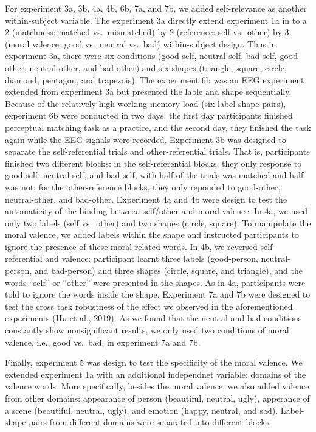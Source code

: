 \documentclass[
  man]{apa6}
\begin{document}
For experiment 3a, 3b, 4a, 4b, 6b, 7a, and 7b, we added self-relevance as another within-subject variable. The experiment 3a directly extend experiment 1a in to a 2 (matchness: matched vs.~mismatched) by 2 (reference: self vs.~other) by 3 (moral valence: good vs.~neutral vs.~bad) within-subject design. Thus in experiment 3a, there were six conditions (good-self, neutral-self, bad-self, good-other, neutral-other, and bad-other) and six shapes (triangle, square, circle, diamond, pentagon, and trapezois). The experiment 6b was an EEG experiment extended from experiment 3a but presented the lable and shape sequentially. Because of the relatively high working memory load (six label-shape pairs), experiment 6b were conducted in two days: the first day participants finished perceptual matching task as a practice, and the second day, they finished the task again while the EEG signals were recorded. Experiment 3b was designed to separate the self-referential trials and other-referential trials. That is, participants finished two different blocks: in the self-referential blocks, they only response to good-self, neutral-self, and bad-self, with half of the trials was matched and half was not; for the other-reference blocks, they only reponded to good-other, neutral-other, and bad-other. Experiment 4a and 4b were design to test the automaticity of the binding between self/other and moral valence. In 4a, we used only two labels (self vs.~other) and two shapes (circle, square). To manipulate the moral valence, we added labels within the shape and instructed participants to ignore the presence of these moral related words. In 4b, we reversed self-referential and valence: participant learnt three labels (good-person, neutral-person, and bad-person) and three shapes (circle, square, and triangle), and the words \enquote{self} or \enquote{other} were presented in the shapes. As in 4a, participants were told to ignore the words inside the shape. Experiment 7a and 7b were designed to test the cross task robustness of the effect we observed in the aforementioned experiments (Hu et al., 2019). As we found that the neutral and bad conditions constantly show nonsignificant results, we only used two conditions of moral valence, i.e., good vs.~bad, in experiment 7a and 7b.

Finally, experiment 5 was design to test the specificity of the moral valence. We extended experiment 1a with an additional independnet variable: domains of the valence words. More specifically, besides the moral valence, we also added valence from other domains: appearance of person (beautiful, neutral, ugly), apperance of a scene (beautiful, neutral, ugly), and emotion (happy, neutral, and sad). Label-shape pairs from different domains were separated into different blocks.
\end{document}
